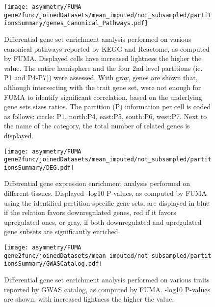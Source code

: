 \begin{adjustwidth}{-3cm}{-3cm}
\begin{figure}[H]
	\centering
	\texttt{[image: asymmetry/FUMA gene2func/joinedDatasets/mean\_imputed/not\_subsampled/partitionsSummary/genes\_Canonical\_Pathways.pdf]}
	
	\caption[Canonical pathways GSEA genes]{Differential gene set enrichment analysis performed on various canonical pathways reported by KEGG and Reactome, as computed by FUMA. Displayed cells have increased lightness the higher the value. The entire hemisphere and the four 2nd level partitions (ie. P1 and P4-P7)) were assessed. With gray, genes are shown that, although intersecting with the trait gene set, were not enough for FUMA to identify significant correlation, based on the underlying gene sets sizes ratios. The partition (P) information per cell is coded as follows: circle: P1, north:P4, east:P5, south:P6, west:P7. Next to the name of the category, the total number of related genes is displayed.}
	\label{fig:can_pathways_genes}
\end{figure}
\end{adjustwidth}
\begin{figure}[H]
	\centering
	\texttt{[image: asymmetry/FUMA gene2func/joinedDatasets/mean\_imputed/not\_subsampled/partitionsSummary/DEG.pdf]}
	
	\caption[Differential gene expression enrichment analysis]{Differential gene expression enrichment analysis performed on different tissues. Displayed -log10 P-values, as computed by FUMA using the identified partition-specific gene sets, are displayed in blue if the relation favors downregulated genes, red if it favors upregulated ones, or gray, if both downregulated and upregulated gene subsets are significantly enriched.}
	\label{fig:de_genes}
\end{figure}
\begin{figure}[H]
	\centering
	\texttt{[image: asymmetry/FUMA gene2func/joinedDatasets/mean\_imputed/not\_subsampled/partitionsSummary/GWASCatalog.pdf]}
	
	\caption[GWAS Catalog GSEA -log10P values]{Differential gene set enrichment analysis performed on various traits reported by GWAS catalog, as computed by FUMA. -log10 P-values are shown, with increased lightness the higher the value.}
	\label{fig:gw_catalog}
\end{figure}
